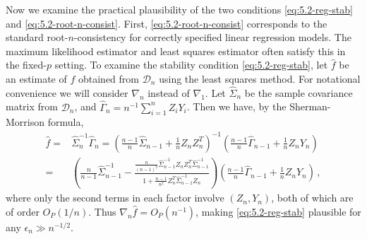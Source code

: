 \documentclass[11pt]{article}
\theoremstyle{plain}
\newcommand{\D}{{\mathcal{D}}}
\begin{document}
Now we examine the practical plausibility of the two conditions \eqref{eq:5.2-reg-stab} and \eqref{eq:5.2-root-n-consist}.  First, \eqref{eq:5.2-root-n-consist} corresponds to the standard root-$n$-consistency for correctly specified linear regression models.  The maximum likelihood estimator and least squares estimator often satisfy this in the fixed-$p$ setting.  To examine the stability condition \eqref{eq:5.2-reg-stab}, let $\hat f$ be an estimate of $f$ obtained from $\D_n$ using the least squares method. For notational convenience we will consider $\nabla_n$ instead of $\nabla_1$. Let $\hat\Sigma_{n}$ be the sample covariance matrix from $\D_{n}$, and $\hat\Gamma_{n}=n^{-1}\sum_{i=1}^n Z_i Y_i$.
Then we have, by the Sherman-Morrison formula,
\begin{align*}
\hat f = & \hat\Sigma_n^{-1}\hat\Gamma_n = \left(\frac{n-1}{n}\hat\Sigma_{n-1}+\frac{1}{n}Z_n Z_n^T\right)^{-1}\left(\frac{n-1}{n}\hat\Gamma_{n-1}+\frac{1}{n}Z_n Y_n\right)\\
=& \left(\frac{n}{n-1}\hat\Sigma_{n-1}^{-1}-\frac{\frac{n}{(n-1)^2}\hat\Sigma_{n-1}^{-1}Z_n Z_n^T\hat\Sigma_{n-1}^{-1}}{1+\frac{n-1}{n^2}Z_n^T\hat\Sigma_{n-1}^{-1}Z_n}\right)\left(\frac{n-1}{n}\hat\Gamma_{n-1}+\frac{1}{n}Z_n Y_n\right)\,,
\end{align*}
where only the second terms in each factor involve $(Z_n,Y_n)$, both of which are of order $O_P(1/n)$. Thus $\nabla_n \hat f = O_P(n^{-1})$, making \eqref{eq:5.2-reg-stab} plausible for any $\epsilon_n\gg n^{-1/2}$.
\end{document}
